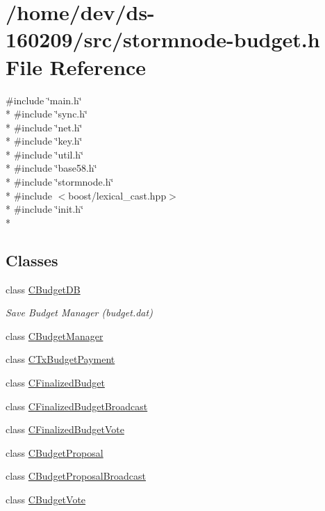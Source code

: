 \hypertarget{stormnode-budget_8h}{}\section{/home/dev/ds-\/160209/src/stormnode-\/budget.h File Reference}
\label{stormnode-budget_8h}
{\ttfamily \#include \char`\"{}main.\+h\char`\"{}}\\*
{\ttfamily \#include \char`\"{}sync.\+h\char`\"{}}\\*
{\ttfamily \#include \char`\"{}net.\+h\char`\"{}}\\*
{\ttfamily \#include \char`\"{}key.\+h\char`\"{}}\\*
{\ttfamily \#include \char`\"{}util.\+h\char`\"{}}\\*
{\ttfamily \#include \char`\"{}base58.\+h\char`\"{}}\\*
{\ttfamily \#include \char`\"{}stormnode.\+h\char`\"{}}\\*
{\ttfamily \#include $<$boost/lexical\+\_\+cast.\+hpp$>$}\\*
{\ttfamily \#include \char`\"{}init.\+h\char`\"{}}\\*
\subsection*{Classes}
\begin{DoxyCompactItemize}
\item 
class \hyperlink{class_c_budget_d_b}{C\+Budget\+D\+B}
\begin{DoxyCompactList}\small\item\em Save Budget Manager (budget.\+dat) \end{DoxyCompactList}\item 
class \hyperlink{class_c_budget_manager}{C\+Budget\+Manager}
\item 
class \hyperlink{class_c_tx_budget_payment}{C\+Tx\+Budget\+Payment}
\item 
class \hyperlink{class_c_finalized_budget}{C\+Finalized\+Budget}
\item 
class \hyperlink{class_c_finalized_budget_broadcast}{C\+Finalized\+Budget\+Broadcast}
\item 
class \hyperlink{class_c_finalized_budget_vote}{C\+Finalized\+Budget\+Vote}
\item 
class \hyperlink{class_c_budget_proposal}{C\+Budget\+Proposal}
\item 
class \hyperlink{class_c_budget_proposal_broadcast}{C\+Budget\+Proposal\+Broadcast}
\item 
class \hyperlink{class_c_budget_vote}{C\+Budget\+Vote}
\end{DoxyCompactItemize}

